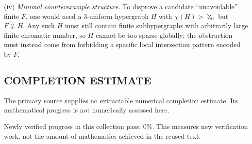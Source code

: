 (iv) \emph{Minimal counterexample structure.}
To disprove a candidate ``unavoidable'' finite $F$, one would need a 3-uniform hypergraph $H$ with $\chi(H)>\aleph_0$ but $F\not\subseteq H$.
Any such $H$ must still contain finite subhypergraphs with arbitrarily large finite chromatic number, so $H$ cannot be too sparse globally; the obstruction must instead come from forbidding a specific local intersection pattern encoded by $F$.




\subsection*{COMPLETION ESTIMATE}
The primary source supplies no extractable numerical completion estimate. Its mathematical progress is not numerically assessed here.

Newly verified progress in this collection pass: $0\%$. This measures new verification work, not the amount of mathematics achieved in the reused text.
